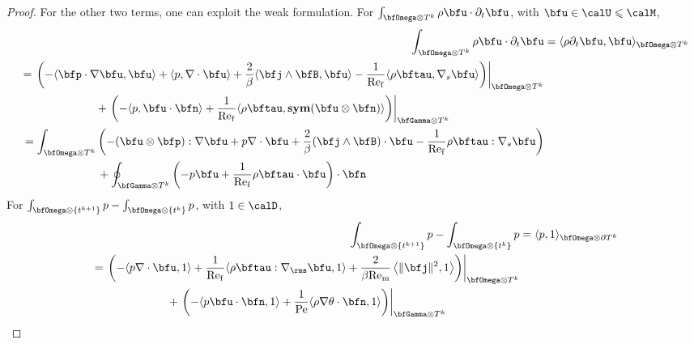 \begin{proof}
            For the other two terms, one can exploit the weak formulation. For $\int_{\bfOmega\otimes T^{k}}\rho\bfu\cdot\partial_{t}\bfu$, with $\bfu  \in  \calU  \leqslant  \calM$,
            \begin{align}
                \int_{\bfOmega\otimes T^{k}}\rho\bfu\cdot\partial_{t}\bfu  &=  \langle\rho\partial_{t}\bfu, \bfu\rangle_{\bfOmega\otimes T^{k}}  \\
                \begin{split}
                    &=  \left.\left(- \langle\bfp\cdot\nabla\bfu, \bfu\rangle + \langle p, \nabla\cdot\bfu\rangle + \frac{2}{\beta}\langle\bfj\wedge\bfB, \bfu\rangle - \frac{1}{\rmRef}\langle\rho\bftau, \nabla_{s}\bfu\rangle\right)\right|_{\bfOmega\otimes T^{k}}  \\
                    &\;\;\;\;\;\;\;\;\;\;\;\;\;\;\;\;\;\;\;\;\;\;\;\;  + \left.\left(- \langle p, \bfu\cdot\bfn\rangle + \frac{1}{\rmRef}\langle\rho\bftau, \sym(\bfu\otimes\bfn)\rangle\right)\right|_{\bfGamma\otimes T^{k}}
                \end{split}  \\
                \begin{split}
                    &=  \int_{\bfOmega\otimes T^{k}}\left(- (\bfu\otimes\bfp):\nabla\bfu + p\nabla\cdot\bfu + \frac{2}{\beta}(\bfj\wedge\bfB)\cdot\bfu - \frac{1}{\rmRef}\rho\bftau:\nabla_{s}\bfu\right)  \\
                    &\;\;\;\;\;\;\;\;\;\;\;\;\;\;\;\;\;\;\;\;\;\;\;\;  + \oint_{\bfGamma\otimes T^{k}}\left(- p\bfu + \frac{1}{\rmRef}\rho\bftau\cdot\bfu\right)\cdot\bfn
                \end{split}
            \end{align}
            For $\int_{\bfOmega\otimes\left\{t^{k + 1}\right\}}p - \int_{\bfOmega\otimes\left\{t^{k}\right\}}p$, with $1  \in  \calD$,
            \begin{align}
                \int_{\bfOmega\otimes\left\{t^{k + 1}\right\}}p - \int_{\bfOmega\otimes\left\{t^{k}\right\}}p  &=  \langle p, 1\rangle_{\bfOmega\otimes\partial T^{k}}  \\
                \begin{split}
                    &=  \left.\left(- \langle p\nabla\cdot\bfu, 1\rangle + \frac{1}{\rmRef}\langle\rho\bftau:\nabla_{\rms}\bfu, 1\rangle + \frac{2}{\beta\rmRem}\left\langle\|\bfj\|^{2}, 1\right\rangle\right)\right|_{\bfOmega\otimes T^{k}}  \\
                    &\;\;\;\;\;\;\;\;\;\;\;\;\;\;\;\;\;\;\;\;\;\;\;\;+ \left.\left(- \langle p\bfu\cdot\bfn, 1\rangle + \frac{1}{\rmPe}\langle\rho\nabla\theta\cdot\bfn, 1\rangle\right)\right|_{\bfGamma\otimes T^{k}}

\end{split}
\end{align}
\end{proof}

